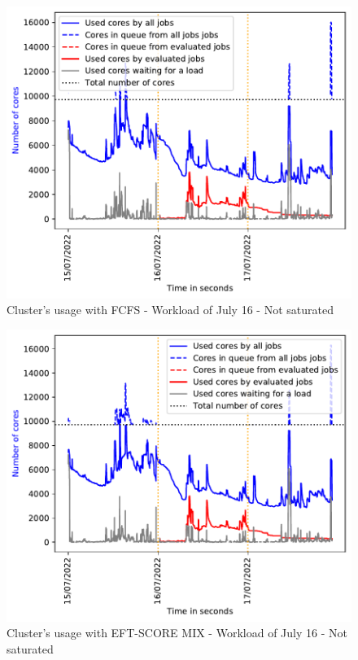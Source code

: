\documentclass[conference,10pt]{IEEEtran}
\begin{document}
\begin{figure}[H]\centering\includegraphics[width=1\linewidth]{../MBSS/plot/Cluster_usage/2022-07-16->2022-07-16_V10000_Fcfs_Used_nodes_Reduced_450_128_32_256_4_1024_core_by_core.pdf}\caption{Cluster's usage with FCFS - Workload of July 16 - Not saturated}\end{figure}
\begin{figure}[H]\centering\includegraphics[width=1\linewidth]{../MBSS/plot/Cluster_usage/2022-07-16->2022-07-16_V10000_Fcfs_with_a_score_mixed_strategy_x500_x1_x0_x0_Used_nodes_Reduced_450_128_32_256_4_1024_core_by_core.pdf}\caption{Cluster's usage with EFT-SCORE MIX - Workload of July 16 - Not saturated}\end{figure}
\end{document}
